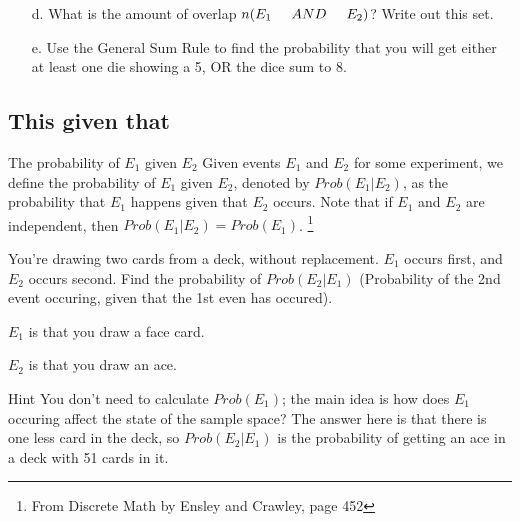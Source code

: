 {\begin{questionNOGRADE}{\thequestion}
\begin{itemize}
            \item[d.]   What is the amount of overlap $n(E_1 \tab[0.5cm]AND\tab[0.5cm] E_2)$? Write out this set.
                        ~\\ \vspace{.5cm}

            \item[e.]   Use the General Sum Rule to find the probability that you will get either at least one die showing a 5, OR the dice sum to 8.
                        ~\\
        \end{itemize}

    \end{questionNOGRADE}

    \newpage

    \subsection{This given that}

        \begin{intro}{The probability of $E_{1}$ given $E_{2}$}
            Given events $E_{1}$ and $E_{2}$ for some experiment, we
            define the probability of $E_{1}$ given $E_{2}$, denoted by
            $Prob(E_{1} | E_{2})$, as the probability that $E_{1}$ happens
            given that $E_{2}$ occurs. Note that if $E_{1}$ and $E_{2}$
            are independent, then $Prob( E_{1} | E_{2}) = Prob(E_{1})$.
            \footnote{From Discrete Math by Ensley and Crawley, page 452}
        \end{intro}

        
    \begin{questionNOGRADE}{\thequestion}
        You're drawing two cards from a deck, without replacement.
        $E_{1}$ occurs first, and $E_{2}$ occurs second. Find
        the probability of $Prob(E_{2}|E_{1})$ (Probability of the 2nd
        event occuring, given that the 1st even has occured).

        $E_{1}$ is that you draw a face card.

        $E_{2}$ is that you draw an ace.

        \begin{hint}{Hint}
            You don't need to calculate $Prob(E_{1})$; the main idea is
            how does $E_{1}$ occuring affect the state of the sample space?
            The answer here is that there is one less card in the deck,
            so $Prob(E_{2}|E_{1})$ is the probability of getting an ace
            in a deck with 51 cards in it.
        \end{hint}
    \end{questionNOGRADE}

}

